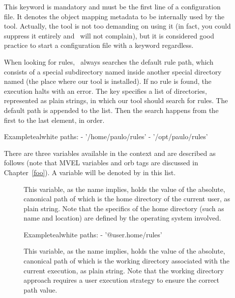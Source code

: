 \begin{description}
\item[] This keyword is mandatory and must be the first line of a configuration file. It denotes the object mapping metadata to be internally used by the tool. Actually, the tool is not too demanding on using it (in fact, you could suppress it entirely and \arara\ will not complain), but it is considered good practice to start a configuration file with a  keyword regardless.

\item[] When looking for rules, \arara\ always searches the default rule path, which consists of a special subdirectory named  inside another special directory named  (the place where our tool is installed). If no rule is found, the execution halts with an error. The  key specifies a list of directories, represented as plain strings, in which our tool should search for rules. The default path is appended to the list. Then the search happens from the first to the last element, in order.

\begin{codebox}{Example}{teal}{\icnote}{white}
paths:
- '/home/paulo/rules'
- '/opt/paulo/rules'
\end{codebox}

There are three variables available in the  context and are described as follows (note that MVEL variables and orb tags are discussed in Chapter~\ref{foo}). A variable will be denoted by  in this list.

\begin{description}
\item[] This variable, as the name implies, holds the value of the absolute, canonical path of  which is the home directory of the current user, as plain string. Note that the specifics of the home directory (such as name and location) are defined by the operating system involved.

\begin{codebox}{Example}{teal}{\icnote}{white}
paths:
- '@{user.home}/rules'
\end{codebox}

\item[] This variable, as the name implies, holds the value of the absolute, canonical path of  which is the working directory associated with the current execution, as plain string. Note that the working directory approach requires a user execution strategy to ensure the correct path value.


\end{description}
\end{description}
